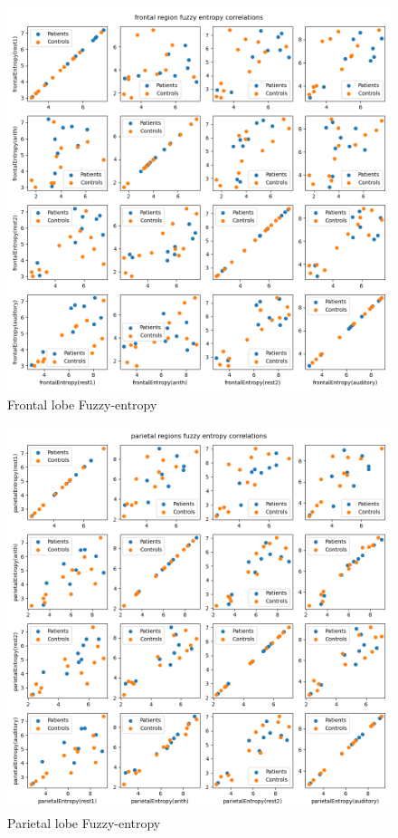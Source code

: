 \documentclass[10pt]{article}
\begin{document}
\begin{figure}[H]
  \includegraphics[width=16cm]{../../../data_analysis_results/FuzzEnt/frontal_region_corr.png}
  \caption{Frontal lobe Fuzzy-entropy}\label{frontal_fuzz}
\end{figure}
\begin{figure}[H]
  \includegraphics[width=16cm]{../../../data_analysis_results/FuzzEnt/parietal_region_corr.png}
  \caption{Parietal lobe Fuzzy-entropy}\label{parietal_fuzz}
\end{figure}
\end{document}
